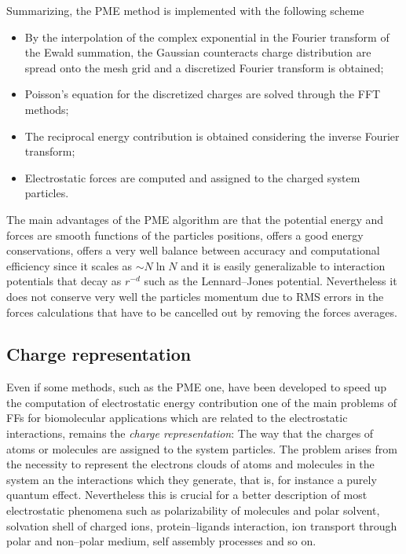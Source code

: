 Summarizing, the \ac{PME} method is implemented with the following scheme
\begin{itemize}
	\item By the interpolation of the complex exponential in the Fourier transform of the Ewald summation, the Gaussian counteracts charge distribution are spread onto the mesh grid and a discretized Fourier transform is obtained;
	\item Poisson's equation for the discretized charges are solved through the \ac{FFT} methods;
	\item The reciprocal energy contribution is obtained considering the inverse Fourier transform;
	\item Electrostatic forces are computed and assigned to the charged system particles.
\end{itemize}
The main advantages of the \ac{PME} algorithm are that the potential energy and forces are smooth functions of the particles positions, offers a good energy conservations, offers a very well balance between accuracy and computational efficiency since it scales as $\sim N\ln N$ and it is easily generalizable to interaction potentials that decay as $r^{-d}$ such as the Lennard--Jones potential. Nevertheless it does not conserve very well the particles momentum due to \ac{RMS} errors in the forces calculations that have to be cancelled out by removing the forces averages.

\subsection{Charge representation}
\label{sec:chargeRep}
Even if some methods, such as the \ac{PME} one, have been developed to speed up the computation of electrostatic energy contribution one of the main problems of \acp{FF} for biomolecular applications which are related to the electrostatic interactions, remains the \textit{charge representation}: The way that the charges of atoms or molecules are assigned to the system particles. The problem arises from the necessity to represent the electrons clouds of atoms and molecules in the system an the interactions which they generate, that is, for instance a purely quantum effect. Nevertheless this is crucial for a better description of most electrostatic phenomena such as polarizability of molecules and polar solvent, solvation shell of charged ions, protein--ligands interaction, ion transport through polar and non--polar medium, self assembly processes and so on.


